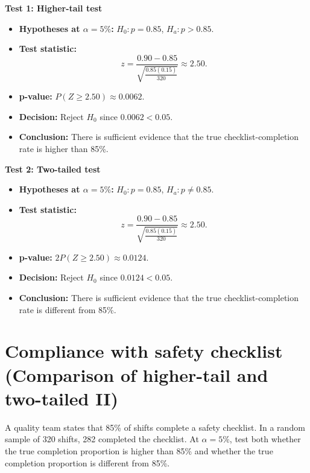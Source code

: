 \textbf{Test 1: Higher-tail test}

\begin{itemize}
	\item \textbf{Hypotheses at \(\alpha=5\%\):} \(H_0\colon p=0.85\), \(H_a\colon p>0.85\).
	\item \textbf{Test statistic:}
	\[
	z=\frac{0.90-0.85}{\sqrt{\frac{0.85(0.15)}{320}}}\approx 2.50.
	\]
	\item \textbf{p-value:} \(P(Z\ge 2.50)\approx 0.0062\).
	\item \textbf{Decision:} Reject \(H_0\) since \(0.0062<0.05\).
	\item \textbf{Conclusion:} There is sufficient evidence that the true checklist-completion rate is higher than 85\%.
\end{itemize}

\begin{center}
\end{center}


\textbf{Test 2: Two-tailed test}

\begin{itemize}
	\item \textbf{Hypotheses at \(\alpha=5\%\):} \(H_0\colon p=0.85\), \(H_a\colon p\ne0.85\).
	\item \textbf{Test statistic:}
	\[
	z=\frac{0.90-0.85}{\sqrt{\frac{0.85(0.15)}{320}}}\approx 2.50.
	\]
	\item \textbf{p-value:} \(2P(Z\ge 2.50)\approx 0.0124\).
	\item \textbf{Decision:} Reject \(H_0\) since \(0.0124<0.05\).
	\item \textbf{Conclusion:} There is sufficient evidence that the true checklist-completion rate is different from 85\%.
\end{itemize}

\begin{center}
\end{center}


\section{Compliance with safety checklist (Comparison of higher-tail and two-tailed II)}
A quality team states that 85\% of shifts complete a safety checklist. In a random sample of 320 shifts, 282 completed the checklist. At \(\alpha=5\%\), test both whether the true completion proportion is higher than 85\% and whether the true completion proportion is different from 85\%.

